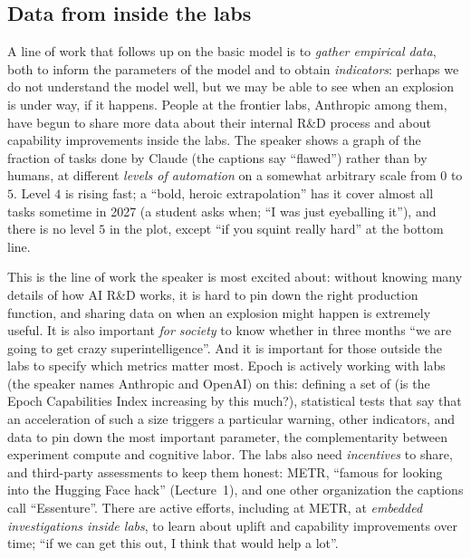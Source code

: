 \subsection{Data from inside the labs}\label{sec:L4-data}
A line of work that follows up on the basic model is to \emph{gather empirical data}, both to inform the parameters of the model and to obtain \emph{indicators}: perhaps we do not understand the model well, but we may be able to see when an explosion is under way, if it happens. People at the frontier labs, Anthropic among them, have begun to share more data about their internal R\&D process and about capability improvements inside the labs. The speaker shows a graph of the fraction of tasks done by Claude\flag{} (the captions say ``flawed'') rather than by humans, at different \emph{levels of automation} on a somewhat arbitrary scale from $0$ to $5$. Level $4$ is rising fast; a ``bold, heroic extrapolation'' has it cover almost all tasks sometime in 2027 (a student asks when; ``I was just eyeballing it''), and there is no level $5$ in the plot, except ``if you squint really hard'' at the bottom line.

This is the line of work the speaker is most excited about: without knowing many details of how AI R\&D works, it is hard to pin down the right production function, and sharing data on when an explosion might happen is extremely useful. It is also important \emph{for society} to know whether in three months ``we are going to get crazy superintelligence''. And it is important for those outside the labs to specify which metrics matter most. Epoch is actively working with labs (the speaker names Anthropic and OpenAI) on this: defining a set of  (is the Epoch Capabilities Index increasing by this much?), statistical tests that say that an acceleration of such a size triggers a particular warning, other indicators, and data to pin down the most important parameter, the complementarity between experiment compute and cognitive labor. The labs also need \emph{incentives} to share, and third-party assessments to keep them honest: METR, ``famous for looking into the Hugging Face hack'' (Lecture~1), and one other organization the captions call ``Essenture''\flag{}. There are active efforts, including at METR, at \emph{embedded investigations inside labs}, to learn about uplift and capability improvements over time; ``if we can get this out, I think that would help a lot''.

